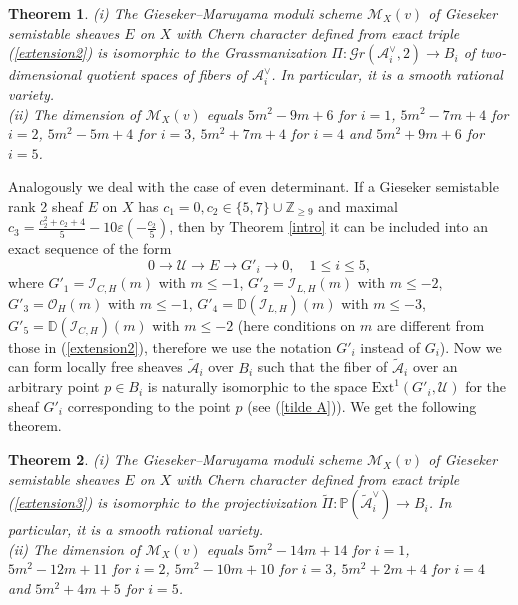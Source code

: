 \documentclass{amsart}
\newtheorem{theorem}{Theorem}[section]
\begin{document}
	\begin{theorem}
		\label{c=-1}(i) The Gieseker--Maruyama moduli scheme $\mathcal M_X(v)$ of Gieseker semistable sheaves $E$ on $X$ with Chern character defined from exact triple (\ref{extension2}) is isomorphic to the Grassmanization $\Pi:\mathcal Gr(\mathcal A_i^\vee,2)\to B_i$ of two-dimensional quotient spaces of fibers of $\mathcal A_i^\vee$. In particular, it is a smooth rational variety. 
		\\
		(ii) The dimension of $\mathcal M_X(v)$ equals $5m^2-9m+6$ for $i=1$, $5m^2-7m+4$ for $i=2$, $5m^2-5m+4$ for $i=3$, $5m^2+7m+4$ for $i=4$ and $5m^2+9m+6$ for $i=5$.
	\end{theorem}
	
	Analogously we deal with the case of even determinant. If a Gieseker semistable rank 2 sheaf $E$ on $X$ has $c_1=0,c_2\in\{5, 7\}\cup\mathbb Z_{\ge 9}$ and maximal $c_3=\frac{c_2^2+c_2+4}{5}-10\varepsilon(-\frac{c_2}{5})$, then by Theorem \ref{intro} it can be included into an exact sequence of the form
	\begin{equation}\label{extension3}0\to\mathcal U\to E\to G'_i\to 0,\quad 1\le i\le 5,
	\end{equation}
	where $G'_1=\mathcal I_{C,H}(m)$ with $m\le -1$, $G'_2=\mathcal I_{L,H}(m)$ with $m\le -2$, $G'_3=\mathcal O_H(m)$ with $m\le -1$, $G'_4=\mathbb D(\mathcal I_{L,H})(m)$ with $m\le -3$, $G'_5=\mathbb D(\mathcal I_{C,H})(m)$ with $m\le -2$ (here conditions on $m$ are different from those in (\ref{extension2}), therefore we use the notation $G'_i$ instead of $G_i$). Now we can form locally free sheaves $\widetilde{\mathcal A}_i$ over $B_i$ such that the fiber of $\widetilde{\mathcal A}_i$ over an arbitrary point $p\in B_i$ is naturally isomorphic to the space $\mathrm{Ext}^1(G'_i,\mathcal U)$ for the sheaf $G'_i$ corresponding to the point $p$ (see (\ref{tilde A})). We get the following theorem.
	
	\begin{theorem}
		\label{c=0}(i) The Gieseker--Maruyama moduli scheme $\mathcal M_X(v)$ of Gieseker semistable sheaves $E$ on $X$ with Chern character defined from exact triple (\ref{extension3}) is isomorphic to the projectivization $\widetilde{\Pi}:\mathbb P(\widetilde{\mathcal A}_i^\vee)\to B_i$. In particular, it is a smooth rational variety. 
	\\	
	(ii) The dimension of $\mathcal M_X(v)$ equals $5m^2-14m+14$ for $i=1$, $5m^2-12m+11$ for $i=2$, $5m^2-10m+10$ for $i=3$, $5m^2+2m+4$ for $i=4$ and $5m^2+4m+5$ for $i=5$.
	\end{theorem}
	
\end{document}
